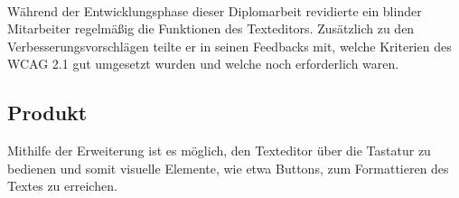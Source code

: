 \mbox{}\\Während der Entwicklungsphase dieser Diplomarbeit revidierte ein blinder Mitarbeiter regelmäßig die Funktionen des Texteditors. Zusätzlich zu den Verbesserungsvorschlägen teilte er in seinen Feedbacks mit, welche Kriterien des WCAG 2.1 gut umgesetzt wurden und welche noch erforderlich waren.

\subsection{Produkt}
Mithilfe der Erweiterung ist es möglich, den Texteditor über die Tastatur zu bedienen und somit visuelle Elemente, wie etwa Buttons, zum Formattieren des Textes zu erreichen. 